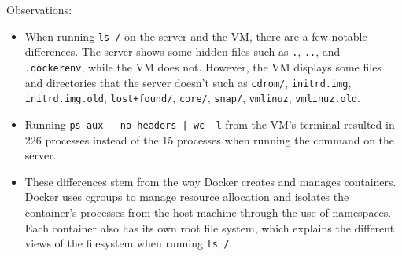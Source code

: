 \documentclass[11pt]{article}
\begin{document}
\noindent Observations:
\begin{itemize}
  \item When running \verb|ls /| on the server and the VM, there are a few notable differences. The server shows some hidden files
  such as \verb|.|, \verb|..|, and \verb|.dockerenv|, while the VM does not. However, the VM displays some files and directories that the server doesn't such as
  \verb|cdrom/|, \verb|initrd.img|, \verb|initrd.img.old|, \verb|lost+found/|, \verb|core/|, \verb|snap/|, \verb|vmlinuz|, \verb|vmlinuz.old|.
  \item Running \verb=ps aux --no-headers | wc -l= from the VM's terminal resulted in 226 processes instead of the 15 processes when running the command on the server.
  \item These differences stem from the way Docker creates and manages containers. Docker uses cgroups to manage resource allocation
  and isolates the container's processes from the host machine through the use of namespaces.
  Each container also has its own root file system, which explains the different views of the filesystem when running \verb|ls /|.~\cite{codementor,demystify}
\end{itemize}
\end{document}

